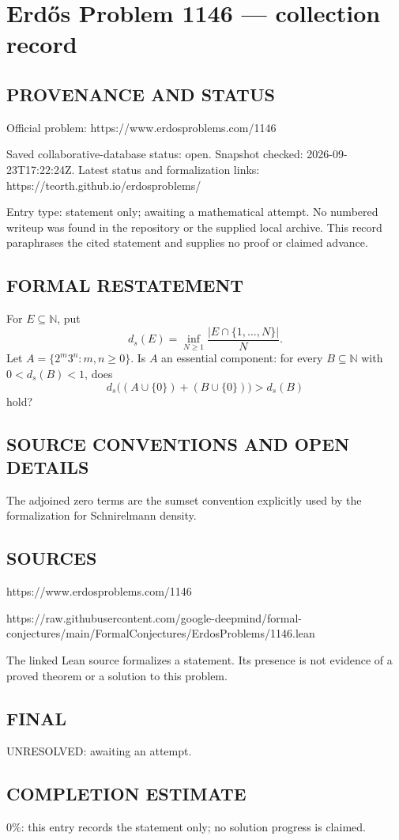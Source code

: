 \section*{Erd\H{o}s Problem 1146 --- collection record}

\subsection*{PROVENANCE AND STATUS}
Official problem: https://www.erdosproblems.com/1146

Saved collaborative-database status: open.
Snapshot checked: 2026-09-23T17:22:24Z.
Latest status and formalization links: https://teorth.github.io/erdosproblems/

Entry type: statement only; awaiting a mathematical attempt. No numbered writeup was found in the repository or the supplied local archive. This record paraphrases the cited statement and supplies no proof or claimed advance.

\subsection*{FORMAL RESTATEMENT}
For $E\subseteq\mathbb N$, put
\[
d_s(E)=\inf_{N\geq1}\frac{|E\cap\{1,\ldots,N\}|}{N}.
\]
Let $A=\{2^m3^n:m,n\geq0\}$. Is $A$ an essential component: for every $B\subseteq\mathbb N$ with $0<d_s(B)<1$, does
\[
d_s\bigl((A\cup\{0\})+(B\cup\{0\})\bigr)>d_s(B)
\]
hold?

\subsection*{SOURCE CONVENTIONS AND OPEN DETAILS}
The adjoined zero terms are the sumset convention explicitly used by the formalization for Schnirelmann density.

\subsection*{SOURCES}
https://www.erdosproblems.com/1146

https://raw.githubusercontent.com/google-deepmind/formal-conjectures/main/FormalConjectures/ErdosProblems/1146.lean

The linked Lean source formalizes a statement. Its presence is not evidence of a proved theorem or a solution to this problem.

\subsection*{FINAL}
UNRESOLVED: awaiting an attempt.

\subsection*{COMPLETION ESTIMATE}
$0\%$: this entry records the statement only; no solution progress is claimed.
